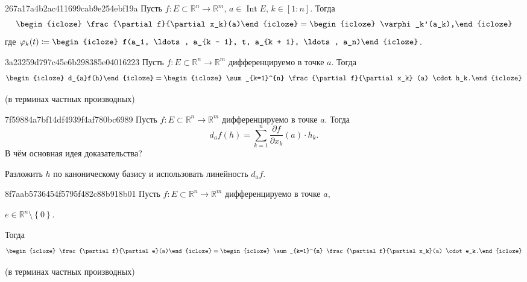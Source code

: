 \begin{note}{267a17a4b2ac411699cab9e254ebf19a}
    Пусть \({ f : E \subset \mathbb R^{n} \to \mathbb R^{m} }\),\: \({ a \in \operatorname{Int} E }\),\: \({ k \in [1 : n] }\).
    Тогда
    \[
        \begin{icloze}{3}\frac{\partial f}{\partial x_k}(a)\end{icloze} = \begin{icloze}{2}\varphi_k'(a_k),\end{icloze}
    \]
    где \({ \varphi_k(t) \coloneqq \begin{icloze}{1}f(a_1, \ldots, a_{k - 1}, t, a_{k + 1}, \ldots, a_n)\end{icloze} }\).
\end{note}

\begin{note}{3a23259d797c45e6b298385e04016223}
    Пусть \({ f : E \subset \mathbb R^{n} \to \mathbb R^{m} }\) дифференцируемо в точке \({ a }\).
    Тогда
    \[
        \begin{icloze}{2}d_{a}f(h)\end{icloze} = \begin{icloze}{1}\sum_{k=1}^{n} \frac{\partial f}{\partial x_k} (a) \cdot h_k.\end{icloze}
    \]

    \begin{center}
        \tiny
        (в терминах частных производных)
    \end{center}
\end{note}

\begin{note}{7f59884a7bf14df4939f4af780bc6989}
    Пусть \({ f : E \subset \mathbb R^{n} \to \mathbb R^{m} }\) дифференцируемо в точке \({ a }\).
    Тогда
    \[
        d_{a}f(h) = \sum_{k=1}^{n} \frac{\partial f}{\partial x_k} (a) \cdot h_k.
    \]
    В чём основная идея доказательства?

    \begin{cloze}{1}
        Разложить \({ h }\) по каноническому базису и использовать линейность \({ d_{a}f }\).
    \end{cloze}
\end{note}

\begin{note}{8f7aab5736454f5795f482c88b918b01}
    Пусть \({ f : E \subset \mathbb R^{n} \to \mathbb R^{m} }\) дифференцируемо в точке \({ a }\),\: \begin{icloze}{3}\({ e \in \mathbb R^{n} \setminus \left\{ 0 \right\} }\).\end{icloze}
    Тогда
    \[
        \begin{icloze}{2}\frac{\partial f}{\partial e}(a)\end{icloze} = \begin{icloze}{1}\sum_{k=1}^{n} \frac{\partial f}{\partial x_k}(a) \cdot e_k.\end{icloze}
    \]

    \begin{center}
        \tiny
        (в терминах частных производных)
    \end{center}
\end{note}

